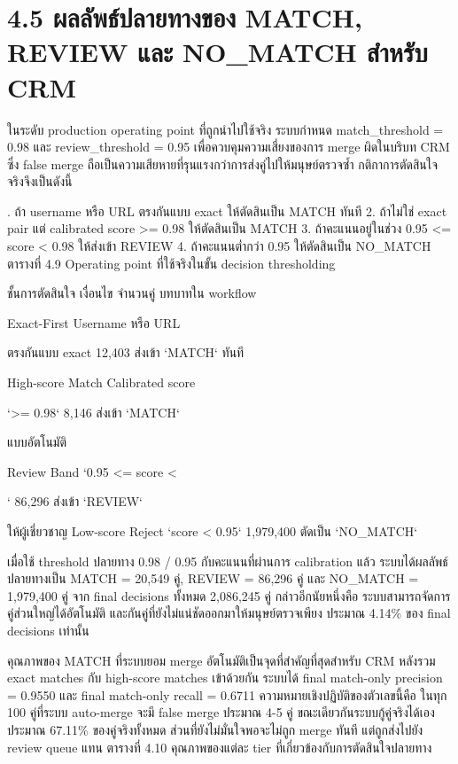 \documentclass[12pt,a4paper]{report}
\begin{document}
\section*{4.5 ผลลัพธ์ปลายทางของ MATCH, REVIEW และ NO\_MATCH สำหรับ CRM}
ในระดับ production operating point ที่ถูกนำไปใช้จริง ระบบกำหนด match\_threshold = 0.98 และ review\_threshold = 0.95 เพื่อควบคุมความเสี่ยงของการ merge ผิดในบริบท CRM ซึ่ง false merge ถือเป็นความเสียหายที่รุนแรงกว่าการส่งคู่ไปให้มนุษย์ตรวจซ้ำ กติกาการตัดสินใจจริงจึงเป็นดังนี้\par
{}. ถ้า username หรือ URL ตรงกันแบบ exact ให้ตัดสินเป็น MATCH ทันที 2. ถ้าไม่ใช่ exact pair แต่ calibrated score >= 0.98 ให้ตัดสินเป็น MATCH 3. ถ้าคะแนนอยู่ในช่วง 0.95 <= score < 0.98 ให้ส่งเข้า REVIEW 4. ถ้าคะแนนต่ำกว่า 0.95 ให้ตัดสินเป็น NO\_MATCH ตารางที่ 4.9 Operating point ที่ใช้จริงในขั้น decision thresholding\par
ชั้นการตัดสินใจ เงื่อนไข จำนวนคู่ บทบาทใน workflow\par
Exact-First Username หรือ URL\par
ตรงกันแบบ exact 12,403 ส่งเข้า `MATCH` ทันที\par
\clearpage
High-score Match Calibrated score\par
`>= 0.98` 8,146 ส่งเข้า `MATCH`\par
แบบอัตโนมัติ\par
Review Band `0.95 <= score <\par
{}` 86,296 ส่งเข้า `REVIEW`\par
ให้ผู้เชี่ยวชาญ Low-score Reject `score < 0.95` 1,979,400 ตัดเป็น `NO\_MATCH`\par
เมื่อใช้ threshold ปลายทาง 0.98 / 0.95 กับคะแนนที่ผ่านการ calibration แล้ว ระบบได้ผลลัพธ์ปลายทางเป็น MATCH = 20,549 คู่, REVIEW = 86,296 คู่ และ NO\_MATCH = 1,979,400 คู่ จาก final decisions ทั้งหมด 2,086,245 คู่ กล่าวอีกนัยหนึ่งคือ ระบบสามารถจัดการคู่ส่วนใหญ่ได้อัตโนมัติ และกันคู่ที่ยังไม่แน่ชัดออกมาให้มนุษย์ตรวจเพียง ประมาณ 4.14\% ของ final decisions เท่านั้น\par
คุณภาพของ MATCH ที่ระบบยอม merge อัตโนมัติเป็นจุดที่สำคัญที่สุดสำหรับ CRM หลังรวม exact matches กับ high-score matches เข้าด้วยกัน ระบบได้ final match-only precision = 0.9550 และ final match-only recall = 0.6711 ความหมายเชิงปฏิบัติของตัวเลขนี้คือ ในทุก 100 คู่ที่ระบบ auto-merge จะมี false merge ประมาณ 4-5 คู่ ขณะเดียวกันระบบกู้คู่จริงได้เองประมาณ 67.11\% ของคู่จริงทั้งหมด ส่วนที่ยังไม่มั่นใจพอจะไม่ถูก merge ทันที แต่ถูกส่งไปยัง review queue แทน ตารางที่ 4.10 คุณภาพของแต่ละ tier ที่เกี่ยวข้องกับการตัดสินใจปลายทาง\par
\end{document}
